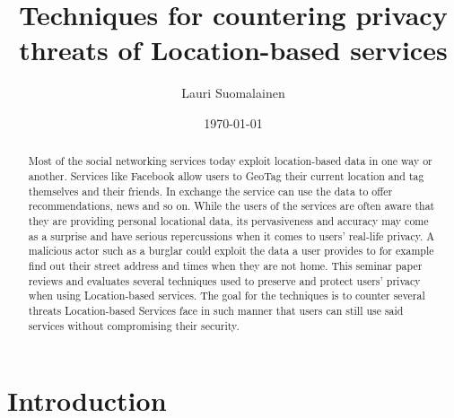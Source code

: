 \documentclass[english]{tktltiki2}
\title{Techniques for countering privacy threats of Location-based services}
\author{Lauri Suomalainen}
\date{\today}
\theoremstyle{definition}
\theoremstyle{remark}
\begin{document}

\frontmatter      %

\maketitle        %
\makeabstract     %

\tableofcontents  %


\mainmatter       %
\begin{abstract}

Most of the social networking services today exploit location-based data in one way or another. Services like Facebook allow users to GeoTag their current location and tag themselves and their friends. In exchange the service can use the data to offer recommendations, news and so on.  While the users of the services are often aware that they are providing personal locational data, its pervasiveness and accuracy may come as a surprise and have serious repercussions when it comes to users' real-life privacy. A malicious actor such as a burglar could exploit the data a user provides to for example find out their street address and times when they are not home.
This seminar paper reviews and evaluates several techniques used to preserve and protect users' privacy when using Location-based services. The goal for the techniques is to counter several threats Location-based Services face in such manner that users can still use said services without compromising their security.

\end{abstract}

\section{Introduction}
\end{document}
